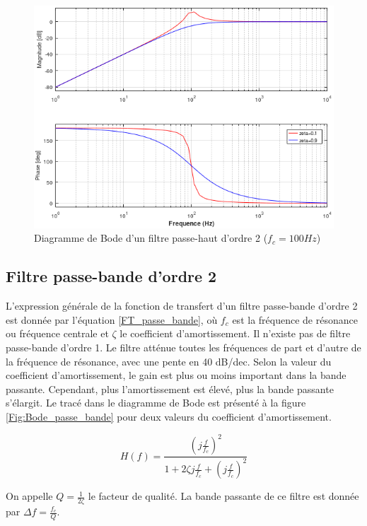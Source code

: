 	\begin{figure}[h!]
		\centering
		\includegraphics[scale=0.75]{images/Bode_passe_haut_2.png}
		\caption{Diagramme de Bode d'un filtre passe-haut d'ordre 2 ($f_{c}=100 Hz$)}	
		\label{Fig:Bode_passe_haut_2} 
	\end{figure}
	
	\subsection{Filtre passe-bande d'ordre 2}
	L'expression générale de la fonction de transfert d'un filtre passe-bande d'ordre 2 est donnée par l'équation \ref{FT_passe_bande}, où $f_{c}$ est la fréquence de résonance ou fréquence centrale et $\zeta$ le coefficient d'amortissement. Il n'existe pas de filtre passe-bande d'ordre 1. Le filtre atténue toutes les fréquences de part et d'autre de la fréquence de résonance, avec une pente en 40 dB/dec. Selon la valeur du coefficient d'amortissement, le gain est plus ou moins important dans la bande passante. Cependant, plus l'amortissement est élevé, plus la bande passante s'élargit. Le tracé dans le diagramme de Bode est présenté à la figure \ref{Fig:Bode_passe_bande} pour deux valeurs du coefficient d'amortissement.
	
	\begin{equation}\label{FT_passe_bande}
	H(f) = \frac{(j\frac{f}{f_{c}})^{2}}{1+2\zeta j\frac{f}{f_{c}}+(j\frac{f}{f_{c}})^{2}}
	\end{equation}
	
	On appelle $Q = \frac{1}{2\zeta}$ le facteur de qualité. La bande passante de ce filtre est donnée par $\Delta f=\frac{f_{c}}{Q}$.
	

